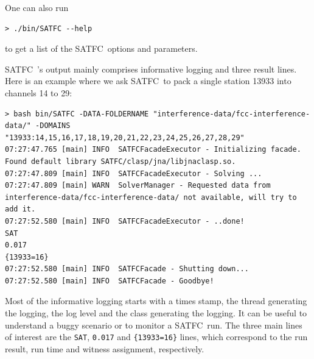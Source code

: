 \documentclass[
10pt, %
letterpaper, %
oneside, %
headinclude,footinclude, %
BCOR5mm, %
needspace, %
]{scrartcl}
\newcommand{\SATFC}{\textsc{SATFC}~}
\begin{document}
One can also run
\begin{lstlisting}[style=Bash]
> ./bin/SATFC --help
\end{lstlisting}
to get a list of the \SATFC options and parameters.

\SATFC's output mainly comprises informative logging and three result lines. Here is an example where we ask \SATFC to pack a single station 13933 into channels 14 to 29:
\begin{lstlisting}[style=Bash]
> bash bin/SATFC -DATA-FOLDERNAME "interference-data/fcc-interference-data/" -DOMAINS "13933:14,15,16,17,18,19,20,21,22,23,24,25,26,27,28,29"
07:27:47.765 [main] INFO  SATFCFacadeExecutor - Initializing facade.
Found default library SATFC/clasp/jna/libjnaclasp.so.
07:27:47.809 [main] INFO  SATFCFacadeExecutor - Solving ...
07:27:47.809 [main] WARN  SolverManager - Requested data from interference-data/fcc-interference-data/ not available, will try to add it.
07:27:52.580 [main] INFO  SATFCFacadeExecutor - ..done!
SAT
0.017
{13933=16}
07:27:52.580 [main] INFO  SATFCFacade - Shutting down...
07:27:52.580 [main] INFO  SATFCFacade - Goodbye!
\end{lstlisting}
Most of the informative logging starts with a times stamp, the thread generating the logging, the log level and the class generating the logging. It can be useful to understand a buggy scenario or to monitor a \SATFC run. The three main lines of interest are the \texttt{SAT}, \texttt{0.017} and \texttt{\{13933=16\}} lines, which correspond to the run result, run time and witness assignment, respectively.
\end{document}
